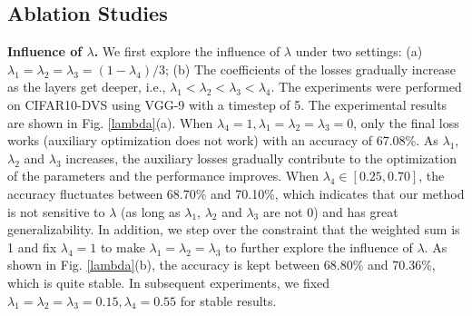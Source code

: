 \documentclass[letterpaper]{article} %
\begin{document}
\subsection{Ablation Studies}

\textbf{Influence of $\lambda$.} We first explore the influence of $\lambda$ under two settings: (a) $\lambda_1=\lambda_2=\lambda_3=(1-\lambda_4)/3$; (b) The coefficients of the losses gradually increase as the layers get deeper, i.e., $\lambda_1<\lambda_2<\lambda_3<\lambda_4$. The experiments were performed on CIFAR10-DVS using VGG-9 with a timestep of 5. The experimental results are shown in Fig. \ref{lambda}(a). When $\lambda_4=1, \lambda_1=\lambda_2=\lambda_3=0$, only the final loss works (auxiliary optimization does not work) with an accuracy of 67.08\%. As $\lambda_1$, $\lambda_2$ and $\lambda_3$ increases, the auxiliary losses gradually contribute to the optimization of the parameters and the performance improves. When $\lambda_4\in[0.25,0.70]$, the accuracy fluctuates between 68.70\% and 70.10\%, which indicates that our method is not sensitive to $\lambda$ (as long as $\lambda_1$, $\lambda_2$ and $\lambda_3$ are not 0) and has great generalizability. In addition, we step over the constraint that the weighted sum is 1 and fix $\lambda_4=1$ to make $\lambda_1=\lambda_2=\lambda_3$ to further explore the influence of $\lambda$. As shown in Fig. \ref{lambda}(b), the accuracy is kept between 68.80\% and 70.36\%, which is quite stable. In subsequent experiments, we fixed $\lambda_1=\lambda_2=\lambda_3=0.15,\lambda_4=0.55$ for stable results.
\end{document}
